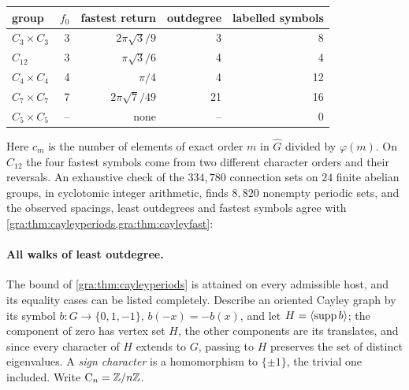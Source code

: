 \begin{center}\small\upshape
\begin{tabular}{lrrrr}
\toprule
group & $f_0$ & fastest return & outdegree & labelled symbols\\
\midrule
$C_3\times C_3$ & 3 & $2\pi\sqrt3/9$ & 3 & 8\\
$C_{12}$ & 3 & $\pi\sqrt3/6$ & 4 & 4\\
$C_4\times C_4$ & 4 & $\pi/4$ & 4 & 12\\
$C_7\times C_7$ & 7 & $2\pi\sqrt7/49$ & 21 & 16\\
$C_5\times C_5$ & -- & none & -- & 0\\
\bottomrule
\end{tabular}
\end{center}
Here $c_m$ is the number of elements of exact order $m$ in $\widehat G$
divided by $\varphi(m)$. On $C_{12}$ the four fastest symbols come from two
different character orders and their reversals. An exhaustive check of the
$334{,}780$ connection sets on $24$ finite abelian groups, in cyclotomic
integer arithmetic, finds $8{,}820$ nonempty periodic sets, and the observed
spacings, least outdegrees and fastest symbols agree with
\cref{gra:thm:cayleyperiods,gra:thm:cayleyfast}:

\paragraph{All walks of least outdegree.}
The bound of \cref{gra:thm:cayleyperiods} is attained on every admissible
host, and its equality cases can be listed completely. Describe an
oriented Cayley graph by its symbol $b:G\to\{0,1,-1\}$, $b(-x)=-b(x)$, and
let $H=\langle\operatorname{supp} b\rangle$; the component of zero has vertex set $H$,
the other components are its translates, and since every character of $H$
extends to $G$, passing to $H$ preserves the set of distinct eigenvalues.
A \emph{sign character} is a homomorphism to $\{\pm1\}$, the trivial one
included. Write $\mathrm{C}_n=\mathbb{Z}/n\mathbb{Z}$.

